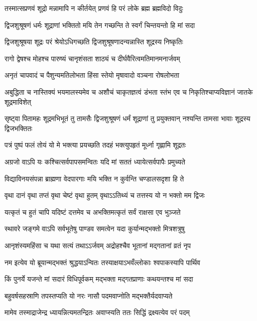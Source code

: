 \twolineshloka
{तस्मात्सप्रणवं शूद्रो मन्नामापि न कीर्तयेत्}
{प्रणवं हि परं लोके ब्रह्म ब्रह्मविदो विदुः}


\twolineshloka
{द्विजशुश्रूषणं धर्मः शूद्राणां भक्तितो मयि}
{तेन गच्छन्ति ते स्वर्गं चिन्तयन्तो हि मां सदा}


\twolineshloka
{द्विजशुश्रूषया शूद्रः परं श्रेयोऽधिगच्छति}
{द्विजशुश्रूषणादन्यन्नास्ति शूद्रस्य निष्कृतिः}


\twolineshloka
{रागो द्वेषश्च मोहश्च पारुष्यं चानृशंसता}
{शाठ्यं च दीर्घवैरित्वमतिमानमनार्जवम्}


\twolineshloka
{अनृतं चापवादं च पैशुन्यमतिलोभता}
{हिंसा स्तेयो मृषावादो वञ्चना रोषलोभता}


\threelineshloka
{अबुद्धिता च नास्तिक्यं भयमालस्यमेव च}
{अशौचं चाकृतज्ञत्वं डंभता स्तंभ एव च}
{निकृतिश्चाप्यविज्ञानं जातके शूद्रमाविशेत्}


\threelineshloka
{सृष्ट्वा पितामहः शूद्रमभिभूतं तु तामसैः}
{द्विजशुश्रूषणं धर्मं शूद्राणां तु प्रयुक्तवान्}
{नश्यन्ति तामसा भावाः शूद्रस्य द्विजभक्तितः}


\twolineshloka
{पत्रं पुष्पं फलं तोयं यो मे भक्त्या प्रयच्छति}
{तदहं भक्त्युपहृतं मूर्ध्ना गृह्णामि शूद्रतः}


\twolineshloka
{अग्रजो वाऽपि यः कश्चित्सर्वपापसमन्वितः}
{यदि मां सततं ध्यायेत्सर्वपापैः प्रमुच्यते}


\twolineshloka
{विद्याविनयसंपन्ना ब्राह्मणा वेदपारगाः}
{मयि भक्ति न कुर्वन्ति चण्डालसदृशा हि ते}


\twolineshloka
{वृथा दानं वृथा तप्तं वृथा चेष्टं वृथा हुतम्}
{वृथाऽऽतिथ्यं च तत्तस्य यो न भक्तो मम द्विजः}


\twolineshloka
{यत्कृतं च हुतं चापि यदिष्टं दत्तमेव च}
{अभक्तिमत्कृतं सर्वं राक्षसा एव भुञ्जते}


\twolineshloka
{स्थावरे जङ्गमे वाऽपि सर्वभूतेषु पाण्डव}
{समत्वेन यदा कुर्यान्मद्भक्तो मित्रशत्रुषु}


\twolineshloka
{आनृशंस्यमहिंसा च यथा सत्यं तथाऽऽर्जवम्}
{अद्रोहश्चैव भूतानां मद्गतानां व्रतं नृप}


\twolineshloka
{नम इत्येव यो ब्रूयान्मद्भक्तं श्रुद्धयाऽन्वितः}
{तस्याक्षयाऽभवँल्लोकाः श्वपाकस्यापि पार्थिव}


\twolineshloka
{किं पुनर्ये यजन्ते मां सदारं विधिपूर्वकम्}
{मद्भक्ता मद्गतप्राणाः कथयन्तश्च मां सदा}


\twolineshloka
{बहुवर्षसहस्राणि तपस्तप्यति यो नरः}
{नासौ पदमवाप्नोति मद्भक्तैर्यदवाप्यते}


\twolineshloka
{मामेव तस्माद्राजेन्द्र ध्यायन्नित्यमतन्द्रितः}
{अवाप्स्यति ततः सिद्धिं द्रक्ष्यत्येव परं पदम्}


